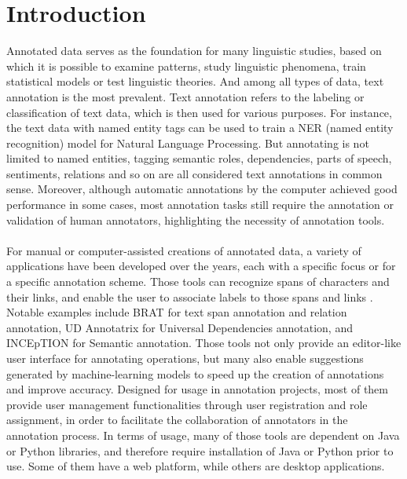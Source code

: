 \documentclass[12ptm a4paper]{article}
\begin{document}
\section{Introduction}
Annotated data serves as the foundation for many linguistic studies, based on which it is possible to examine patterns, study linguistic phenomena, train statistical models or test linguistic theories. And among all types of data, text annotation is the most prevalent. Text annotation refers to the labeling or classification of text data, which is then used for various purposes. For instance, the text data with named entity tags can be used to train a NER (named entity recognition) model for Natural Language Processing. But annotating is not limited to named entities, tagging semantic roles, dependencies, parts of speech, sentiments, relations and so on are all considered text annotations in common sense. Moreover, although automatic annotations by the computer achieved good performance in some cases, most annotation tasks still require the annotation or validation of human annotators, highlighting the necessity of annotation tools.\\
\\
For manual or computer-assisted creations of annotated data, a variety of applications have been developed over the years, each with a specific focus or for a specific annotation scheme. Those tools can recognize spans of characters and their links, and enable the user to associate labels to those spans and links \citep{inbook}. Notable examples include BRAT for text span annotation and relation annotation, UD Annotatrix for Universal Dependencies annotation, and INCEpTION for Semantic annotation. Those tools not only provide an editor-like user interface for annotating operations, but many also enable suggestions generated by machine-learning models to speed up the creation of annotations and improve accuracy. Designed for usage in annotation projects, most of them provide user management functionalities through user registration and role assignment, in order to facilitate the collaboration of annotators in the annotation process. In terms of usage, many of those tools are dependent on Java or Python libraries, and therefore require installation of Java or Python prior to use. Some of them have a web platform, while others are desktop applications.\\
\\
\end{document}
